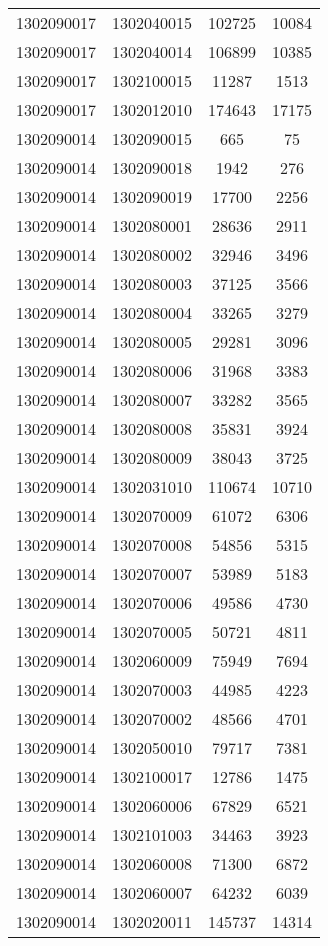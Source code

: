 \begin{longtable}[h]{llcc}
		1302090017 & 1302040015 & 102725 & 10084\\
		1302090017 & 1302040014 & 106899 & 10385\\
		1302090017 & 1302100015 & 11287 & 1513\\
		1302090017 & 1302012010 & 174643 & 17175\\
		1302090014 & 1302090015 & 665 & 75\\
		1302090014 & 1302090018 & 1942 & 276\\
		1302090014 & 1302090019 & 17700 & 2256\\
		1302090014 & 1302080001 & 28636 & 2911\\
		1302090014 & 1302080002 & 32946 & 3496\\
		1302090014 & 1302080003 & 37125 & 3566\\
		1302090014 & 1302080004 & 33265 & 3279\\
		1302090014 & 1302080005 & 29281 & 3096\\
		1302090014 & 1302080006 & 31968 & 3383\\
		1302090014 & 1302080007 & 33282 & 3565\\
		1302090014 & 1302080008 & 35831 & 3924\\
		1302090014 & 1302080009 & 38043 & 3725\\
		1302090014 & 1302031010 & 110674 & 10710\\
		1302090014 & 1302070009 & 61072 & 6306\\
		1302090014 & 1302070008 & 54856 & 5315\\
		1302090014 & 1302070007 & 53989 & 5183\\
		1302090014 & 1302070006 & 49586 & 4730\\
		1302090014 & 1302070005 & 50721 & 4811\\
		1302090014 & 1302060009 & 75949 & 7694\\
		1302090014 & 1302070003 & 44985 & 4223\\
		1302090014 & 1302070002 & 48566 & 4701\\
		1302090014 & 1302050010 & 79717 & 7381\\
		1302090014 & 1302100017 & 12786 & 1475\\
		1302090014 & 1302060006 & 67829 & 6521\\
		1302090014 & 1302101003 & 34463 & 3923\\
		1302090014 & 1302060008 & 71300 & 6872\\
		1302090014 & 1302060007 & 64232 & 6039\\
		1302090014 & 1302020011 & 145737 & 14314\\

\end{longtable}
